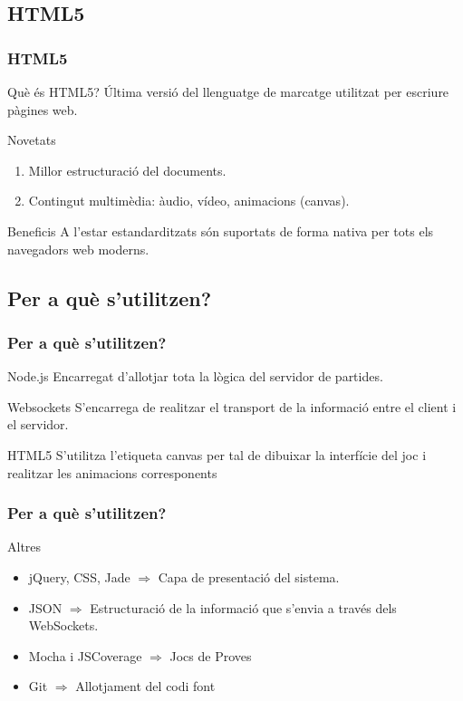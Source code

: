 \documentclass[notitlepage]{beamer}
\begin{document}
\subsection{HTML5}
\begin{frame}
\frametitle{HTML5}
\begin{block}{Què és HTML5?}
Última versió del llenguatge de marcatge utilitzat per escriure pàgines web.
\end{block}

\begin{block}{Novetats}
\begin{enumerate}
    \item{Millor estructuració del documents.}
    \item{Contingut multimèdia: àudio, vídeo, animacions (canvas).}
\end{enumerate}
\end{block}

\begin{block}{Beneficis}
A l'estar estandarditzats són suportats de forma nativa per tots els navegadors web moderns.
\end{block}
\end{frame}


\subsection{Per a què s'utilitzen?}
\begin{frame}
\frametitle{Per a què s'utilitzen?}
\begin{block}{Node.js}
Encarregat d'allotjar tota la lògica del servidor de partides.
\end{block}

\begin{block}{Websockets}
S'encarrega de realitzar el transport de la informació entre el client i el servidor.
\end{block}

\begin{block}{HTML5}
S'utilitza l'etiqueta canvas per tal de dibuixar la interfície del joc i realitzar les animacions corresponents
\end{block}
\end{frame}

\begin{frame}
\frametitle{Per a què s'utilitzen?}
\begin{block}{Altres}
\begin{itemize}
    \item{jQuery, CSS, Jade $\Rightarrow$  Capa de presentació del sistema.}
    \item{JSON $\Rightarrow$  Estructuració de la informació que s'envia a través dels WebSockets.}
    \item{Mocha i JSCoverage $\Rightarrow$ Jocs de Proves}
    \item{Git $\Rightarrow$  Allotjament del codi font}

\end{itemize}
\end{block}
\end{frame}
\end{document}
